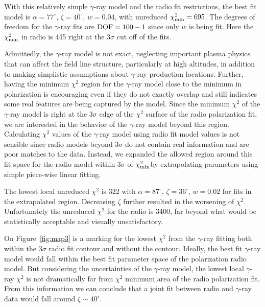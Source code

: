 With this relatively simple $\gamma$-ray model
and the radio fit restrictions, the best fit model is
$\alpha=77^\circ$, $\zeta=40^\circ$, $w=0.04$, with unreduced $\chi^2_{\rm{min}}=695$.
The degrees of freedom for the $\gamma$-ray fits are $\rm{DOF}=100-1$ since
only $w$ is being fit.
Here the $\chi^2_{\rm{min}}$ in radio is 445 right at the $3\sigma$
cut off of the fits.  



Admittedly, the $\gamma$-ray model is not
exact, neglecting important plasma physics that can
affect the field line structure, particularly at
high altitudes, in addition to making simplistic 
assumptions about $\gamma$-ray production locations.  Further, having the minimum 
$\chi^2$ region for the $\gamma$-ray model close to the minimum
in polarization is encouraging even if they do not
exactly overlap and still indicates some real features are
being captured by the model.
Since the minimum $\chi^2$ of the $\gamma$-ray model is right at the 
3$\sigma$ edge of the $\chi^2$ surface of the radio polarization fit, we are interested in
the behavior of the $\gamma$-ray model beyond this region.
Calculating $\chi^2$ values of the $\gamma$-ray model
using radio fit model values is not sensible since radio models beyond $3\sigma$
do not contain real information and are poor matches to the data.
Instead, we expanded the allowed region
around this fit space for the radio model within $3\sigma$ 
of $\chi^2_{\rm{min}}$by extrapolating parameters using simple piece-wise
linear fitting. 

The lowest local unreduced $\chi^2$
is 322 with $\alpha=87^\circ$, $\zeta=36^\circ$, $w=0.02$ 
for fits in the extrapolated region.
Decreasing $\zeta$ further resulted in the worsening of $\chi^2$.
Unfortunately the unreduced $\chi^2$ for the radio is 3400, far beyond what 
would be statistically acceptable and visually unsatisfactory.  

On Figure~\ref{fig:map3} is a marking for the lowest $\chi^2$ from the $\gamma$-ray 
fitting both within the $3\sigma$ radio fit contour and 
without the contour. Ideally, the best fit $\gamma$-ray model would fall
within the best fit parameter space of the polarization radio model.
But considering the uncertainties of the $\gamma$-ray model,
the lowest local $\gamma$-ray $\chi^2$ is not
dramatically far from $\chi^2$ minimum area of the 
radio polarization fit.   
From this information we can conclude that a joint
fit between radio and $\gamma$-ray data would fall around $\zeta\sim40^\circ$.

